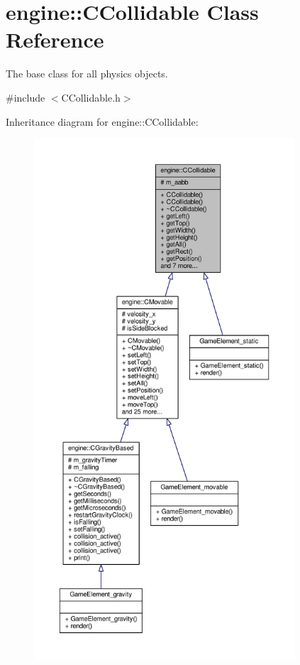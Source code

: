\hypertarget{classengine_1_1CCollidable}{\section{engine\-:\-:C\-Collidable Class Reference}
\label{classengine_1_1CCollidable}
}


The base class for all physics objects.  




{\ttfamily \#include $<$C\-Collidable.\-h$>$}



Inheritance diagram for engine\-:\-:C\-Collidable\-:
\nopagebreak
\begin{figure}[H]
\begin{center}
\leavevmode
\includegraphics[height=550pt]{classengine_1_1CCollidable__inherit__graph}
\end{center}
\end{figure}


